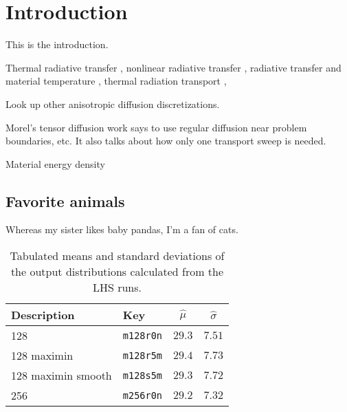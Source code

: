 
\chapter{Introduction}
This is the introduction.

Thermal radiative transfer \cite{Urb2006,McC2008a}, nonlinear radiative transfer
\cite{Den2009}, radiative transfer and material temperature
\cite{Gen2001,Mor2000}, thermal radiation transport \cite{McC2007,Dav2010},

Look up other anisotropic diffusion discretizations.

Morel's tensor diffusion work \cite{Mor2007} says to use regular diffusion near
problem boundaries, etc. It also talks about how only one transport sweep is
needed.

Material energy density \cite{Su2001}

\section{Favorite animals}
Whereas my sister likes baby pandas, I'm a fan of cats.
\begin{table}[htb]
  \centering
\begin{tabular}{llcc}
\toprule
 Description & Key & $\hat\mu$ & $\hat\sigma$ 
\\ \midrule
128                 & \texttt{m128r0n}  & $29.3$ & $7.51$
 \\
128 maximin         & \texttt{m128r5m}  & $29.4$ & $7.73$
 \\
128 maximin smooth  & \texttt{m128s5m}  & $29.3$ & $7.72$
 \\
256                 & \texttt{m256r0n}  & $29.2$ & $7.32$
 \\
\bottomrule
\end{tabular}
  \caption[LHS run results]{Tabulated means and standard deviations of the output distributions calculated from the LHS runs.}
  \label{tab:distribution}
\end{table}

